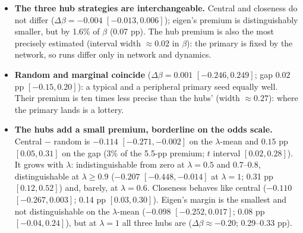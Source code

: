 \documentclass[11pt,a4paper]{article}
\begin{document}
\begin{itemize}
  \item \textbf{The three hub strategies are interchangeable.} Central and closeness do
    not differ ($\Delta\beta = -0.004$ $[-0.013, 0.006]$); eigen's premium is
    distinguishably smaller, but by 1.6\% of $\beta$ (0.07 pp). The hub premium is also
    the most precisely estimated (interval width $\approx 0.02$ in $\beta$): the
    primary is fixed by the network, so runs differ only in network and dynamics.
  \item \textbf{Random and marginal coincide}
    ($\Delta\beta = 0.001$ $[-0.246, 0.249]$; gap $0.02$ pp $[-0.15, 0.20]$): a typical
    and a peripheral primary seed equally well. Their premium is ten times less precise
    than the hubs' (width $\approx 0.27$): where the primary lands is a lottery.
  \item \textbf{The hubs add a small premium, borderline on the odds scale.} Central
    $-$ random is $-0.114$ $[-0.271, -0.002]$ on the $\lambda$-mean and $0.15$ pp
    $[0.05, 0.31]$ on the gap (3\% of the 5.5-pp premium; $t$ interval $[0.02, 0.28]$). It
    grows with $\lambda$: indistinguishable from zero at $\lambda = 0.5$ and
    $0.7$--$0.8$, distinguishable at $\lambda \ge 0.9$ ($-0.207$ $[-0.448, -0.014]$ at
    $\lambda = 1$; 0.31 pp $[0.12, 0.52]$) and, barely, at $\lambda = 0.6$. Closeness
    behaves like central ($-0.110$ $[-0.267, 0.003]$; 0.14 pp $[0.03, 0.30]$). Eigen's
    margin is the smallest and not distinguishable on the $\lambda$-mean ($-0.098$
    $[-0.252, 0.017]$; 0.08 pp $[-0.04, 0.24]$), but at $\lambda = 1$ all three hubs are
    ($\Delta\beta \approx -0.20$; 0.29--0.33 pp).
\end{itemize}
\end{document}

